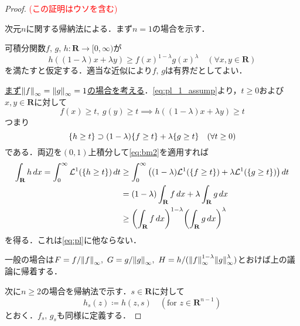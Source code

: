 \documentclass[a4j]{ltjsarticle}
\newcommand{\Rset}{\mathbf{R}}
\newcommand{\Lm}{\mathcal{L}}
\newcommand{\1}{\bm{1}}
\numberwithin{equation}{section}
\theoremstyle{definition}
\begin{document}
\begin{proof}
    \textcolor{red}{(この証明はウソを含む)}
    
    次元$n$に関する帰納法による．まず$n=1$の場合を示す．

    可積分関数$f,\,g,\,h\colon \Rset\to [0,\infty)$が
    \begin{equation}
        h((1-\lambda)x+\lambda y)\geq f(x)^{1-\lambda}g(x)^{\lambda}\quad (\forall x,y\in\Rset)\label{eq:pl_1_assump}
    \end{equation}
    を満たすと仮定する．適当な近似により$f,\,g$は有界だとしてよい．

    \underline{まず$\norm{f}_{\infty}=\norm{g}_{\infty}=1$の場合を考える}．\eqref{eq:pl_1_assump}より，$t\geq0$および$x,y\in\Rset$に対して
    \begin{equation}
        f(x)\geq t,\ g(y)\geq t\implies h((1-\lambda)x+\lambda y)\geq t
    \end{equation}
    つまり
    \begin{equation}
        \qty{h\geq t}\supset (1-\lambda)\qty{f\geq t}+\lambda \qty{g\geq t}\quad (\forall t\geq0)
    \end{equation}
    である．両辺を$(0,1)$上積分して\eqref{eq:bm2}を適用すれば
    \begin{align}
        \int_{\Rset}h\,dx=\int_{0}^{\infty}\Lm^1(\qty{h\geq t})\,dt&\geq \int_{0}^{\infty}\qty((1-\lambda)\Lm^1(\qty{f\geq t})+\lambda \Lm^1(\qty{g\geq t}))\,dt\\
        &=(1-\lambda)\int_{\Rset}f\,dx+\lambda\int_{\Rset}g\,dx\\
        &\geq \qty(\int_{\Rset}f\,dx)^{1-\lambda}\qty(\int_{\Rset}g\,dx)^{\lambda}
    \end{align}
    を得る．これは\eqref{eq:pl}に他ならない．

    一般の場合は$F=f/\norm{f}_{\infty},\ G=g/\norm{g}_{\infty},\ H=h/(\norm{f}_{\infty}^{1-\lambda}\norm{g}_{\infty}^{\lambda})$とおけば上の議論に帰着する．

    次に$n\geq 2$の場合を帰納法で示す．$s\in\Rset$に対して
    \begin{equation}
        h_s(z)\coloneqq h(z,s)\quad (\text{for }z\in\Rset^{n-1})
    \end{equation}
    とおく．$f_s,\,g_s$も同様に定義する．
    

\end{proof}
\end{document}
